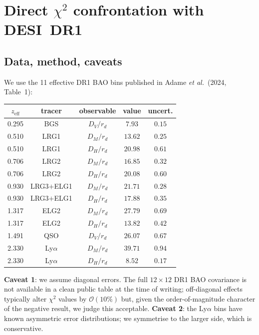 \documentclass[11pt,letterpaper,twoside]{article}
\newcommand{\rd}{r_{d}}
\newcommand{\DM}{D_{M}}
\newcommand{\DH}{D_{H}}
\newcommand{\DV}{D_{V}}
\begin{document}
\section{Direct $\chi^{2}$ confrontation with DESI~DR1}\label{sec:chi2}

\subsection{Data, method, caveats}

We use the 11 effective DR1 BAO bins published in Adame \emph{et al.}~(2024,
Table~1):
\begin{table}[h!]
\centering\small
\begin{tabular}{ccccc}
\toprule
$z_{\mathrm{eff}}$ & tracer        & observable    & value & uncert. \\
\midrule
0.295 & BGS           & $\DV/\rd$  & $7.93$  & $0.15$ \\
0.510 & LRG1          & $\DM/\rd$  & $13.62$ & $0.25$ \\
0.510 & LRG1          & $\DH/\rd$  & $20.98$ & $0.61$ \\
0.706 & LRG2          & $\DM/\rd$  & $16.85$ & $0.32$ \\
0.706 & LRG2          & $\DH/\rd$  & $20.08$ & $0.60$ \\
0.930 & LRG3$+$ELG1   & $\DM/\rd$  & $21.71$ & $0.28$ \\
0.930 & LRG3$+$ELG1   & $\DH/\rd$  & $17.88$ & $0.35$ \\
1.317 & ELG2          & $\DM/\rd$  & $27.79$ & $0.69$ \\
1.317 & ELG2          & $\DH/\rd$  & $13.82$ & $0.42$ \\
1.491 & QSO           & $\DV/\rd$  & $26.07$ & $0.67$ \\
2.330 & Ly$\alpha$    & $\DM/\rd$  & $39.71$ & $0.94$ \\
2.330 & Ly$\alpha$    & $\DH/\rd$  & $8.52$  & $0.17$ \\
\bottomrule
\end{tabular}
\end{table}

\noindent\textbf{Caveat 1}: we assume diagonal errors. The full $12\times12$
DR1 BAO covariance is not available in a clean public table at the time of
writing; off-diagonal effects typically alter $\chi^{2}$ values by
$\mathcal{O}(10\%)$ but, given the order-of-magnitude character of the negative
result, we judge this acceptable.
\textbf{Caveat 2}: the Ly$\alpha$ bins have known asymmetric error
distributions; we symmetrise to the larger side, which is conservative.
\end{document}
